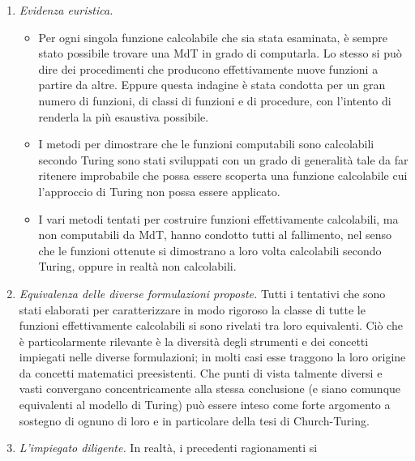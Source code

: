 \begin{enumerate}
    \item \textit{Evidenza euristica.}
          \begin{itemize}
              \item Per ogni singola funzione calcolabile che sia stata esaminata, è
                    sempre stato possibile trovare una MdT in grado di computarla. Lo
                    stesso si può dire dei procedimenti che producono effettivamente
                    nuove funzioni a partire da altre. Eppure questa indagine è stata
                    condotta per un gran numero di funzioni, di classi di funzioni e
                    di procedure, con l'intento di renderla la più esaustiva
                    possibile.
              \item I metodi per dimostrare che le funzioni computabili sono
                    calcolabili secondo Turing sono stati sviluppati con un grado di
                    generalità tale da far ritenere improbabile che possa essere
                    scoperta una funzione calcolabile cui l'approccio di Turing non
                    possa essere applicato.
              \item I vari metodi tentati per costruire funzioni effettivamente
                    calcolabili, ma non computabili da MdT, hanno condotto tutti al
                    fallimento, nel senso che le funzioni ottenute si dimostrano a
                    loro volta calcolabili secondo Turing, oppure in realtà non
                    calcolabili.
          \end{itemize}
    \item \textit{Equivalenza delle diverse formulazioni proposte.} Tutti i tentativi
          che sono stati elaborati per caratterizzare in modo rigoroso la classe di
          tutte le funzioni effettivamente calcolabili si sono rivelati tra loro
          equivalenti. Ciò che è particolarmente rilevante è la diversità degli
          strumenti e dei concetti impiegati nelle diverse formulazioni; in molti
          casi esse traggono la loro origine da concetti matematici preesistenti. Che
          punti di vista talmente diversi e vasti convergano concentricamente alla
          stessa conclusione (e siano comunque equivalenti al modello di Turing) può
          essere inteso come forte argomento a sostegno di ognuno di loro e in
          particolare della tesi di Church-Turing.
    \item \textit{L'impiegato diligente.} In realtà, i precedenti ragionamenti si

\end{enumerate}
